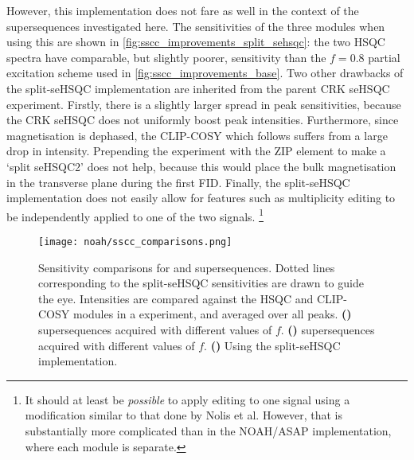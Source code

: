 However, this implementation does not fare as well in the context of the  supersequences investigated here.
The sensitivities of the three modules when using this are shown in \cref{fig:sscc_improvements_split_sehsqc}: the two HSQC spectra have comparable, but slightly poorer, sensitivity than the $f = 0.8$ partial excitation scheme used in \cref{fig:sscc_improvements_base}.
Two other drawbacks of the split-seHSQC implementation are inherited from the parent CRK seHSQC experiment.
Firstly, there is a slightly larger spread in peak sensitivities, because the CRK seHSQC does not uniformly boost peak intensities.
Furthermore, since  magnetisation is dephased, the CLIP-COSY which follows suffers from a large drop in intensity.
Prepending the experiment with the ZIP element to make a `split seHSQC2' does not help, because this would place the bulk magnetisation in the transverse plane during the first FID.
Finally, the split-seHSQC implementation does not easily allow for features such as multiplicity editing to be independently applied to one of the two signals.%
\footnote{It should at least be \textit{possible} to apply editing to one signal using a modification similar to that done by Nolis et al.\autocite{Nolis2019JMR} However, that is substantially more complicated than in the NOAH/ASAP implementation, where each module is separate.}

\begin{figure}[!ht]
    \centering
    \texttt{[image: noah/sscc\_comparisons.png]}%
    {\label{fig:sscc_comparisons_sscc}}%
    {\label{fig:sscc_comparisons_sspcc}}%
    {\label{fig:sscc_comparisons_split_sehsqc}}%
    \caption[Sensitivity comparisons for  and  supersequences]{
        Sensitivity comparisons for  and  supersequences.
        Dotted lines corresponding to the split-seHSQC sensitivities are drawn to guide the eye.
        Intensities are compared against the HSQC and CLIP-COSY modules in a  experiment, and averaged over all peaks.
        \textbf{()}  supersequences acquired with different values of $f$.
        \textbf{()}  supersequences acquired with different values of $f$.
        \textbf{()} Using the split-seHSQC implementation.
    }
    \label{fig:sscc_comparisons}
\end{figure}

